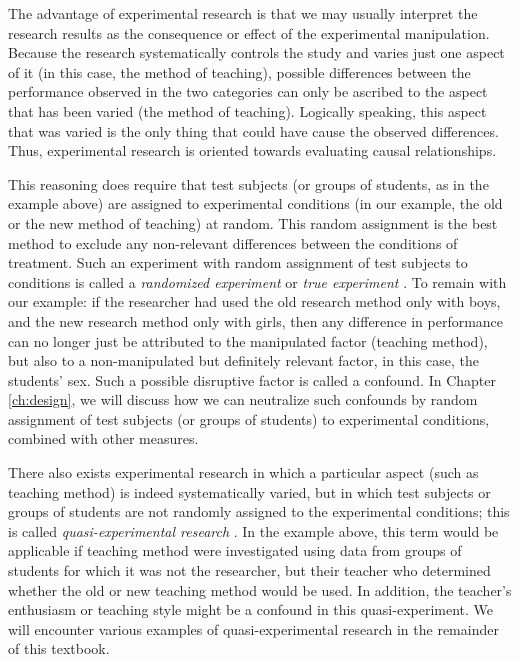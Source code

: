 \documentclass[
]{book}
\begin{document}
The advantage of experimental research is that we may usually interpret the research results as the consequence or effect of the experimental manipulation. Because the research systematically controls the study and varies just one aspect of it (in this case, the method of teaching), possible differences between the performance observed in the two categories can only be ascribed to the aspect that has been varied (the method of teaching). Logically speaking, this aspect that was varied is the only thing that could have cause the observed differences. Thus, experimental research is oriented towards evaluating causal relationships.

This reasoning does require that test subjects (or groups of students, as in the example above) are assigned to experimental conditions (in our example, the old or the new method of teaching) at random. This random assignment is the best method to exclude any non-relevant differences between the conditions of treatment. Such an experiment with random assignment of test subjects to conditions is called a \emph{randomized experiment} or \emph{true experiment} \citep{SCC02}. To remain with our example: if the researcher had used the old research method only with boys, and the new research method only with girls, then any difference in performance can no longer just be attributed to the manipulated factor (teaching method), but also to a non-manipulated but definitely relevant factor, in this case, the students' sex. Such a possible disruptive factor is called a confound. In Chapter \ref{ch:design}, we will discuss how we can neutralize such confounds by random assignment of test subjects (or groups of students) to experimental conditions, combined with other measures.

There also exists experimental research in which a particular aspect (such as teaching method) is indeed systematically varied, but in which test subjects or groups of students are not randomly assigned to the experimental conditions; this is called \emph{quasi-experimental research} \citep{SCC02}. In the example above, this term would be applicable if teaching method were investigated using data from groups of students for which it was not the researcher, but their teacher who determined whether the old or new teaching method would be used. In addition, the teacher's enthusiasm or teaching style might be a confound in this quasi-experiment. We will encounter various examples of quasi-experimental research in the remainder of this textbook.
\end{document}
